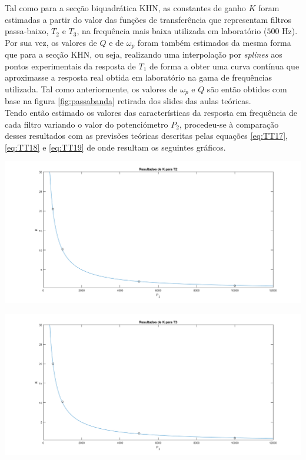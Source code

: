 \documentclass[a4paper,11pt]{report}
\begin{document}
Tal como para a secção biquadrática KHN, as constantes de ganho $K$ foram estimadas a partir do valor das funções de transferência que representam filtros passa-baixo, $T_2$ e $T_3$, na frequência mais baixa utilizada em laboratório ($500$ Hz).\\
Por sua vez, os valores de $Q$ e de $\omega_p$ foram também estimados da mesma forma que para a secção KHN, ou seja, realizando uma interpolação por \textit{splines} aos pontos experimentais da resposta de $T_1$ de forma a obter uma curva contínua que aproximasse a resposta real obtida em laboratório na gama de frequências utilizada. Tal como anteriormente, os valores de $\omega_p$ e $Q$ são então obtidos com base na figura \ref{fig:passabanda} retirada dos slides das aulas teóricas.\\

Tendo então estimado os valores das características da resposta em frequência de cada filtro variando o valor do potenciómetro $P_2$, procedeu-se à comparação desses resultados com as previsões teóricas descritas pelas equações \ref{eq:TT17}, \ref{eq:TT18} e \ref{eq:TT19} de onde resultam os seguintes gráficos.

\begin{center}
     \includegraphics[angle=0,width=1\textwidth]{RelacaoK2P2TT.png}
     \label{fig:RelacaoK2P2TT}
     \end{center}

\begin{center}
     \includegraphics[angle=0,width=1\textwidth]{RelacaoK3P2TT.png}
     \label{fig:RelacaoK3P2TT}
     \end{center}
     
\end{document}
